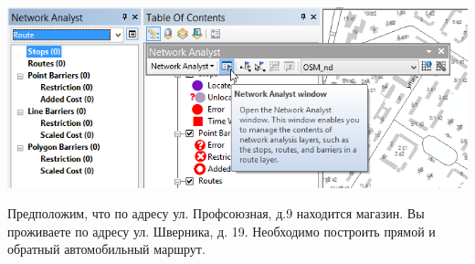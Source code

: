 \documentclass[12pt,]{book}
\begin{document}
\begin{enumerate}
  \includegraphics{images/Ex12/image9.png}
\end{enumerate}

Предположим, что по адресу ул. Профсоюзная, д.9 находится магазин. Вы проживаете по адресу ул. Шверника, д. 19. Необходимо построить прямой и обратный автомобильный маршрут.
\end{document}
